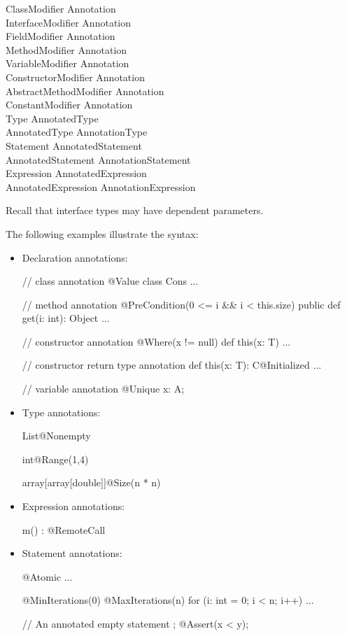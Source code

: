 \begin{grammar}
ClassModifier \: Annotation \\
InterfaceModifier \: Annotation \\
FieldModifier \: Annotation \\
MethodModifier \: Annotation \\
VariableModifier \: Annotation \\
ConstructorModifier \: Annotation \\
AbstractMethodModifier \: Annotation \\
ConstantModifier \: Annotation \\
Type \: AnnotatedType \\
AnnotatedType \: Annotation\plus Type \\
Statement \: AnnotatedStatement \\
AnnotatedStatement \: Annotation\plus Statement \\
Expression \: AnnotatedExpression \\
AnnotatedExpression \: Annotation\plus Expression \\
\end{grammar}

\noindent
Recall that interface types may have dependent parameters.

\noindent
The following examples illustrate the syntax:

\begin{itemize}
\item Declaration annotations:
\begin{xtennoindent}
  // class annotation
  @Value
  class Cons { ... }

  // method annotation
  @PreCondition(0 <= i && i < this.size)
  public def get(i: int): Object { ... }

  // constructor annotation
  @Where(x != null)
  def this(x: T) { ... }

  // constructor return type annotation
  def this(x: T): C@Initialized { ... }

  // variable annotation
  @Unique x: A;
\end{xtennoindent}
\item Type annotations:
\begin{xtennoindent}
  List@Nonempty

  int@Range(1,4)

  array[array[double]]@Size(n * n)
\end{xtennoindent}
\item Expression annotations:
\begin{xtennoindent}
  m() : @RemoteCall
\end{xtennoindent}
\item Statement annotations:
\begin{xtennoindent}
  @Atomic { ... }

  @MinIterations(0)
  @MaxIterations(n)
  for (i: int = 0; i < n; i++) { ... }

  // An annotated empty statement ;
  @Assert(x < y);
\end{xtennoindent}
\end{itemize}

